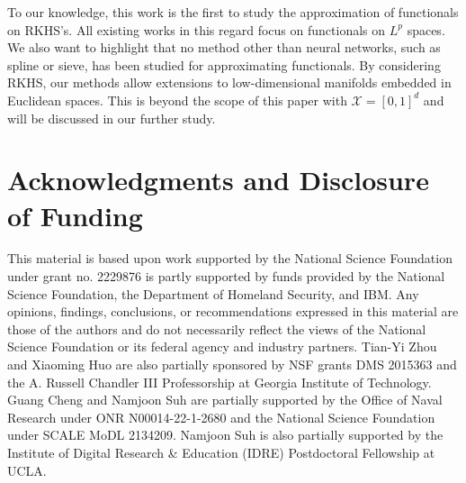 \documentclass{article}
\numberwithin{equation}{section}
\begin{document}
To our knowledge, this work is the first to study the approximation of functionals on RKHS's. All existing works in this regard focus on functionals on $L^p$ spaces. 
We also want to highlight that no method other than neural networks, such as spline or sieve, has been studied for approximating functionals. 
By considering RKHS, 
our methods allow extensions to low-dimensional manifolds embedded in Euclidean spaces. 
This is beyond the scope of this paper with $\mathcal{X} = [0,1]^d$ and will be discussed in our further study.

\section{Acknowledgments and Disclosure of Funding}
This material is based upon work supported by the National Science Foundation under grant no. 2229876 is partly supported by funds provided by the National Science Foundation, the Department of Homeland Security, and IBM.
Any opinions, findings, conclusions, or recommendations expressed in this material are those of the authors and do not necessarily reflect the views of the National Science Foundation or its federal agency and industry partners.
Tian-Yi Zhou and Xiaoming Huo are also partially sponsored by NSF grants DMS 2015363 and the A. Russell Chandler III Professorship at Georgia Institute of Technology. Guang Cheng and Namjoon Suh are partially supported by the Office of Naval Research under ONR N00014-22-1-2680 and the National Science Foundation under SCALE MoDL 2134209. 
Namjoon Suh is also partially supported by the Institute of Digital Research \& Education (IDRE) Postdoctoral Fellowship at UCLA. 
\end{document}
